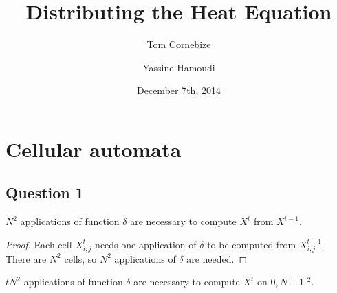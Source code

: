 


\title{Distributing the Heat Equation}
\author{Tom Cornebize \and Yassine Hamoudi}
\date{December 7th, 2014}



\maketitle


\section{Cellular automata}


\subsection*{Question 1}

\begin{lemma}
  \label{nextStep}
  $N^2$ applications of function $\delta$ are necessary to compute $X^t$ from $X^{t-1}$.
\end{lemma}

\begin{proof}
 Each cell $X^{t}_{i,j}$ needs one application of $\delta$ to be computed from $X^{t-1}_{i,j}$. There are $N^2$ cells, so $N^2$ applications of $\delta$ are needed.
\end{proof}

\begin{prop}
  $tN^2$ applications of function $\delta$ are necessary to compute $X^t$ on \textlbrackdbl $0,N-1$ \textrbrackdbl$^2$.
\end{prop}

